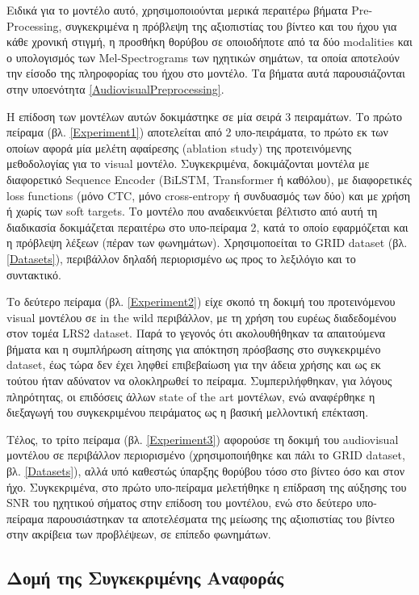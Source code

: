 Ειδικά για το μοντέλο αυτό, χρησιμοποιούνται μερικά περαιτέρω βήματα Pre-Processing, συγκεκριμένα η πρόβλεψη της αξιοπιστίας του βίντεο και του ήχου για κάθε χρονική στιγμή, η προσθήκη θορύβου σε οποιοδήποτε από τα δύο modalities και ο υπολογισμός των Mel-Spectrograms των ηχητικών σημάτων, τα οποία αποτελούν την είσοδο της πληροφορίας του ήχου στο μοντέλο. Τα βήματα αυτά παρουσιάζονται στην υποενότητα \ref{AudiovisualPreprocessing}.

Η επίδοση των μοντέλων αυτών δοκιμάστηκε σε μία σειρά 3 πειραμάτων. Το πρώτο πείραμα (βλ. \ref{Experiment1}) αποτελείται από 2 υπο-πειράματα, το πρώτο εκ των οποίων αφορά μία μελέτη αφαίρεσης (ablation study) της προτεινόμενης μεθοδολογίας για το visual μοντέλο. Συγκεκριμένα, δοκιμάζονται μοντέλα με διαφορετικό Sequence Encoder (BiLSTM, Transformer ή καθόλου), με διαφορετικές loss functions (μόνο CTC, μόνο cross-entropy ή συνδυασμός των δύο) και με χρήση ή χωρίς των soft targets. Το μοντέλο που αναδεικνύεται βέλτιστο από αυτή τη διαδικασία δοκιμάζεται περαιτέρω στο υπο-πείραμα 2, κατά το οποίο εφαρμόζεται και η πρόβλεψη λέξεων (πέραν των φωνημάτων). Χρησιμοποείται το GRID dataset (βλ. \ref{Datasets}), περιβάλλον δηλαδή περιορισμένο ως προς το λεξιλόγιο και το συντακτικό.

Το δεύτερο πείραμα (βλ. \ref{Experiment2}) είχε σκοπό τη δοκιμή του προτεινόμενου visual μοντέλου σε in the wild περιβάλλον, με τη χρήση του ευρέως διαδεδομένου στον τομέα LRS2 dataset. Παρά το γεγονός ότι ακολουθήθηκαν τα απαιτούμενα βήματα και η συμπλήρωση αίτησης για απόκτηση πρόσβασης στο συγκεκριμένο dataset, έως τώρα δεν έχει ληφθεί επιβεβαίωση για την άδεια χρήσης και ως εκ τούτου ήταν αδύνατον να ολοκληρωθεί το πείραμα. Συμπεριλήφθηκαν, για λόγους πληρότητας, οι επιδόσεις άλλων state of the art μοντέλων, ενώ αναφέρθηκε η διεξαγωγή του συγκεκριμένου πειράματος ως η βασική μελλοντική επέκταση.

Τέλος, το τρίτο πείραμα (βλ. \ref{Experiment3}) αφορούσε τη δοκιμή του audiovisual μοντέλου σε περιβάλλον περιορισμένο (χρησιμοποιήθηκε και πάλι το GRID dataset, βλ. \ref{Datasets}), αλλά υπό καθεστώς ύπαρξης θορύβου τόσο στο βίντεο όσο και στον ήχο. Συγκεκριμένα, στο πρώτο υπο-πείραμα μελετήθηκε η επίδραση της αύξησης του SNR του ηχητικού σήματος στην επίδοση του μοντέλου, ενώ στο δεύτερο υπο-πείραμα παρουσιάστηκαν τα αποτελέσματα της μείωσης της αξιοπιστίας του βίντεο στην ακρίβεια των προβλέψεων, σε επίπεδο φωνημάτων.

\subsection{Δομή της Συγκεκριμένης Αναφοράς}

